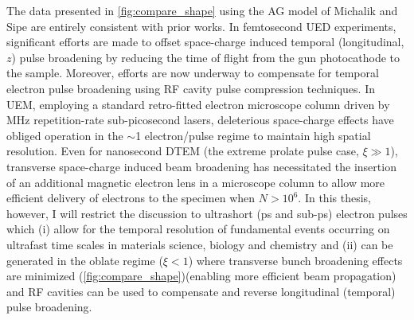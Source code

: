 The data presented in \ref{fig:compare_shape} using the AG model of Michalik and Sipe \cite{michalik_analytic_2006} are entirely consistent with prior works.\cite{reed_femtosecond_2006,siwick_ultrafast_2002}
In femtosecond UED experiments, significant efforts are made to offset space-charge induced temporal (longitudinal, $z$) pulse broadening by reducing the time of flight from the gun photocathode to the sample.\cite{siwick_ultrafast_2002,reed_evolution_2009}
Moreover, efforts are now underway to compensate for temporal electron pulse broadening using RF cavity pulse compression techniques.\cite{oudheusden_electron_2007}
In UEM, employing a standard retro-fitted electron microscope column driven by MHz repetition-rate sub-picosecond lasers,\cite{lobastov_four-dimensional_2005} deleterious space-charge effects have obliged operation in the $\sim$1 electron/pulse regime to maintain high spatial resolution.
Even for nanosecond DTEM (the extreme prolate pulse case, $\xi \gg 1 $), transverse space-charge induced beam broadening has necessitated the insertion of an additional magnetic electron lens in a microscope column to allow more efficient delivery of electrons to the specimen when $ N > 10^{6} $.\cite{lagrange_nanosecond_2008}
In this thesis, however, I will restrict the discussion to ultrashort (ps and sub-ps) electron pulses which (i) allow for the temporal resolution of fundamental events occurring on ultrafast time scales in materials science, biology and chemistry \cite{king_ultrafast_2005} and (ii) can be generated in the oblate regime ($ \xi < 1 $) where transverse bunch broadening effects are minimized (\ref{fig:compare_shape})(enabling more efficient beam propagation) and RF cavities can be used to compensate and reverse longitudinal (temporal) pulse broadening.\cite{veisz_hybrid_2007}

